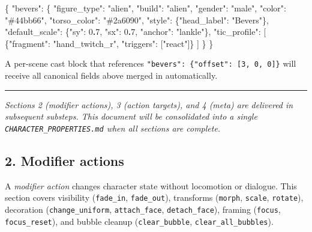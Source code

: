 \documentclass[
  11pt,
]{book}
\newenvironment{Shaded}{}{}
\newcommand{\DataTypeTok}[1]{\textcolor[rgb]{0.56,0.13,0.00}{#1}}
\newcommand{\DecValTok}[1]{\textcolor[rgb]{0.25,0.63,0.44}{#1}}
\newcommand{\ErrorTok}[1]{\textcolor[rgb]{1.00,0.00,0.00}{\textbf{#1}}}
\newcommand{\FunctionTok}[1]{\textcolor[rgb]{0.02,0.16,0.49}{#1}}
\newcommand{\OtherTok}[1]{\textcolor[rgb]{0.00,0.44,0.13}{#1}}
\newcommand{\StringTok}[1]{\textcolor[rgb]{0.25,0.44,0.63}{#1}}
\begin{document}
\begin{Shaded}
\begin{Highlighting}[]
\FunctionTok{\{}
  \DataTypeTok{"bevers"}\FunctionTok{:} \FunctionTok{\{}
    \DataTypeTok{"figure\_type"}\FunctionTok{:} \StringTok{"alien"}\FunctionTok{,}
    \DataTypeTok{"build"}\FunctionTok{:} \StringTok{"alien"}\FunctionTok{,}
    \DataTypeTok{"gender"}\FunctionTok{:} \StringTok{"male"}\FunctionTok{,}
    \DataTypeTok{"color"}\FunctionTok{:} \StringTok{"\#44bb66"}\FunctionTok{,}
    \DataTypeTok{"torso\_color"}\FunctionTok{:} \StringTok{"\#2a6090"}\FunctionTok{,}
    \DataTypeTok{"style"}\FunctionTok{:} \FunctionTok{\{}\DataTypeTok{"head\_label"}\FunctionTok{:} \StringTok{"Bevers"}\FunctionTok{\},}
    \DataTypeTok{"default\_scale"}\FunctionTok{:} \FunctionTok{\{}\DataTypeTok{"sy"}\FunctionTok{:} \DecValTok{0}\ErrorTok{.}\DecValTok{7}\FunctionTok{,} \DataTypeTok{"sx"}\FunctionTok{:} \DecValTok{0}\ErrorTok{.}\DecValTok{7}\FunctionTok{,} \DataTypeTok{"anchor"}\FunctionTok{:} \StringTok{"lankle"}\FunctionTok{\},}
    \DataTypeTok{"tic\_profile"}\FunctionTok{:} \OtherTok{[}
      \FunctionTok{\{}\DataTypeTok{"fragment"}\FunctionTok{:} \StringTok{"hand\_twitch\_r"}\FunctionTok{,} \DataTypeTok{"triggers"}\FunctionTok{:} \OtherTok{[}\StringTok{"react"}\OtherTok{]}\FunctionTok{\}}
    \OtherTok{]}
  \FunctionTok{\}}
\FunctionTok{\}}
\end{Highlighting}
\end{Shaded}

A per-scene cast block that references
\texttt{"bevers":\ \{"offset":\ {[}3,\ 0,\ 0{]}\}} will receive all
canonical fields above merged in automatically.

\begin{center}\rule{0.5\linewidth}{0.5pt}\end{center}

\emph{Sections 2 (modifier actions), 3 (action targets), and 4 (meta)
are delivered in subsequent substeps. This document will be consolidated
into a single \texttt{CHARACTER\_PROPERTIES.md} when all sections are
complete.}

\subsection{2. Modifier actions}\label{modifier-actions}

A \emph{modifier action} changes character state without locomotion or
dialogue. This section covers visibility (\texttt{fade\_in},
\texttt{fade\_out}), transforms (\texttt{morph}, \texttt{scale},
\texttt{rotate}), decoration (\texttt{change\_uniform},
\texttt{attach\_face}, \texttt{detach\_face}), framing (\texttt{focus},
\texttt{focus\_reset}), and bubble cleanup (\texttt{clear\_bubble},
\texttt{clear\_all\_bubbles}).
\end{document}
